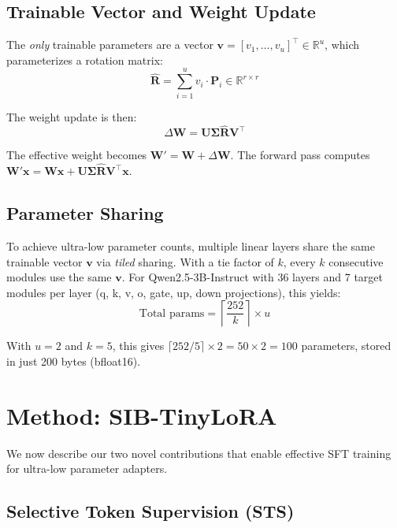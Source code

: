 \documentclass{article}
\newcommand{\R}{\mathbb{R}}
\newcommand{\bv}{\mathbf{v}}
\newcommand{\bP}{\mathbf{P}}
\newcommand{\bU}{\mathbf{U}}
\newcommand{\bV}{\mathbf{V}}
\newcommand{\bW}{\mathbf{W}}
\newcommand{\bR}{\hat{\mathbf{R}}}
\begin{document}
\subsection{Trainable Vector and Weight Update}

The \textit{only} trainable parameters are a vector $\bv = [v_1, \ldots, v_u]^\top \in \R^u$, which parameterizes a rotation matrix:
\begin{equation}
  \bR = \sum_{i=1}^{u} v_i \cdot \bP_i \in \R^{r \times r}
  \label{eq:r_hat}
\end{equation}

The weight update is then:
\begin{equation}
  \Delta\bW = \bU \boldsymbol{\Sigma} \bR \bV^\top
  \label{eq:delta_w}
\end{equation}

The effective weight becomes $\bW' = \bW + \Delta\bW$. The forward pass computes $\bW' \mathbf{x} = \bW\mathbf{x} + \bU \boldsymbol{\Sigma} \bR \bV^\top \mathbf{x}$.

\subsection{Parameter Sharing}

To achieve ultra-low parameter counts, multiple linear layers share the same trainable vector $\bv$ via \textit{tiled} sharing. With a tie factor of $k$, every $k$ consecutive modules use the same $\bv$. For Qwen2.5-3B-Instruct with 36 layers and 7 target modules per layer (q, k, v, o, gate, up, down projections), this yields:
\begin{equation}
  \text{Total params} = \left\lceil \frac{252}{k} \right\rceil \times u
\end{equation}

With $u = 2$ and $k = 5$, this gives $\lceil 252/5 \rceil \times 2 = 50 \times 2 = 100$ parameters, stored in just 200 bytes (bfloat16).

\section{Method: SIB-TinyLoRA}
\label{sec:method}

We now describe our two novel contributions that enable effective SFT training for ultra-low parameter adapters.

\subsection{Selective Token Supervision (STS)}
\label{sec:sts}
\end{document}
